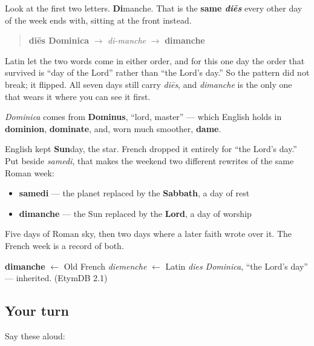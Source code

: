 \begin{grammarlens}[title={Grammar Lens: the ending that moved to the front}]
Look at the first two letters. \textbf{Di}manche. That is the \textbf{same \emph{diēs}} every other day of the week ends with, sitting at the front instead.

\begin{quote}
\textbf{diēs Dominica} $\to$ \emph{di-manche} $\to$ \textbf{dimanche}
\end{quote}

Latin let the two words come in either order, and for this one day the order that survived is \textquotedblleft{}day of the Lord\textquotedblright{} rather than \textquotedblleft{}the Lord's day.\textquotedblright{} So the pattern did not break; it flipped. All seven days still carry \emph{diēs}, and \emph{dimanche} is the only one that wears it where you can see it first.
\end{grammarlens}

\begin{culture}
\emph{Dominica} comes from \textbf{Dominus}, \textquotedblleft{}lord, master\textquotedblright{} — which English holds in \textbf{dominion}, \textbf{dominate}, and, worn much smoother, \textbf{dame}.

English kept \textbf{Sun}day, the star. French dropped it entirely for \textquotedblleft{}the Lord's day.\textquotedblright{} Put beside \emph{samedi}, that makes the weekend two different rewrites of the same Roman week:

\begin{itemize}
\raggedright
  \item \textbf{samedi} — the planet replaced by the \textbf{Sabbath}, a day of rest
  \item \textbf{dimanche} — the Sun replaced by the \textbf{Lord}, a day of worship
\end{itemize}

Five days of Roman sky, then two days where a later faith wrote over it. The French week is a record of both.
\end{culture}

\begin{cousinweb}
\textbf{dimanche} $\leftarrow$ Old French \emph{diemenche} $\leftarrow$ Latin \emph{dies Dominica}, \textquotedblleft{}the Lord's day\textquotedblright{} — inherited. (EtymDB 2.1)
\end{cousinweb}

\subsection*{Your turn}
Say these aloud:

